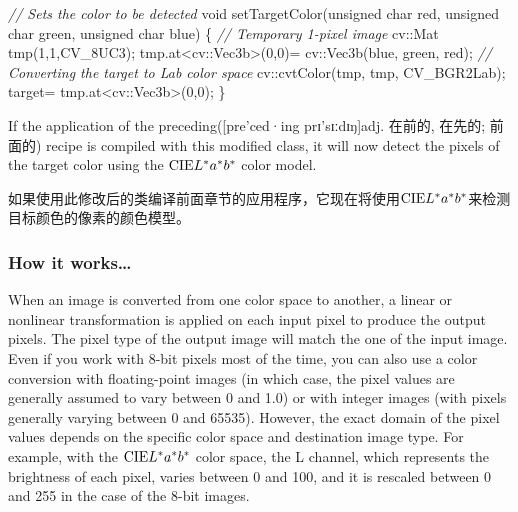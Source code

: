 \documentclass[]{article}
\newenvironment{Shaded}{}{}
\newcommand{\CommentTok}[1]{\textcolor[rgb]{0.38,0.63,0.69}{\textit{#1}}}
\newcommand{\DataTypeTok}[1]{\textcolor[rgb]{0.56,0.13,0.00}{#1}}
\newcommand{\DecValTok}[1]{\textcolor[rgb]{0.25,0.63,0.44}{#1}}
\newcommand{\NormalTok}[1]{#1}
\begin{document}
\begin{Shaded}
\begin{Highlighting}[]
\CommentTok{// Sets the color to be detected}
\DataTypeTok{void}\NormalTok{ setTargetColor(}\DataTypeTok{unsigned} \DataTypeTok{char}\NormalTok{ red, }\DataTypeTok{unsigned} \DataTypeTok{char}\NormalTok{ green, }\DataTypeTok{unsigned} \DataTypeTok{char}\NormalTok{ blue) \{}
    \CommentTok{// Temporary 1-pixel image}
\NormalTok{    cv::Mat tmp(}\DecValTok{1}\NormalTok{,}\DecValTok{1}\NormalTok{,CV_8UC3);}
\NormalTok{    tmp.at<cv::Vec3b>(}\DecValTok{0}\NormalTok{,}\DecValTok{0}\NormalTok{)= cv::Vec3b(blue, green, red);}
    \CommentTok{// Converting the target to Lab color space}
\NormalTok{    cv::cvtColor(tmp, tmp, CV_BGR2Lab);}
\NormalTok{    target= tmp.at<cv::Vec3b>(}\DecValTok{0}\NormalTok{,}\DecValTok{0}\NormalTok{);}
\NormalTok{\}}
\end{Highlighting}
\end{Shaded}

If the application of the preceding({[}pre'ced·ing \textbar{}\textbar{}
prɪ'sɪːdɪŋ{]}adj. 在前的, 在先的; 前面的) recipe is compiled with this
modified class, it will now detect the pixels of the target color using
the \( \text{CIE} \space L^{*} a^{*} b^{*} \) color model.

如果使用此修改后的类编译前面章节的应用程序，它现在将使用\( \text{CIE}  \space L^{*} a^{*} b^{*} \)来检测目标颜色的像素的颜色模型。

\hypertarget{header-n1349}{%
\subsubsection{How it works\ldots{}}\label{header-n1349}}

When an image is converted from one color space to another, a linear or
nonlinear transformation is applied on each input pixel to produce the
output pixels. The pixel type of the output image will match the one of
the input image. Even if you work with 8-bit pixels most of the time,
you can also use a color conversion with floating-point images (in which
case, the pixel values are generally assumed to vary between 0 and 1.0)
or with integer images (with pixels generally varying between 0 and
65535). However, the exact domain of the pixel values depends on the
specific color space and destination image type. For example, with the
\( \text{CIE}  \space L^{*} a^{*} b^{*} \) color space, the L channel,
which represents the brightness of each pixel, varies between 0 and 100,
and it is rescaled between 0 and 255 in the case of the 8-bit images.
\end{document}
